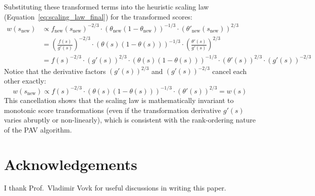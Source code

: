\documentclass[11pt]{article}
\begin{document}
	Substituting these transformed terms into the heuristic scaling law (Equation~\ref{eq:scaling_law_final}) for the transformed scores:
	\begin{align}
		w(s_{\text{new}}) &\propto f_{\text{new}}(s_{\text{new}})^{-2/3} \cdot (\theta_{\text{new}}(1-\theta_{\text{new}}))^{-1/3} \cdot (\theta'_{\text{new}}(s_{\text{new}}))^{2/3} \\
		&= \left( \frac{f(s)}{g'(s)} \right)^{-2/3} \cdot (\theta(s)(1-\theta(s)))^{-1/3} \cdot \left( \frac{\theta'(s)}{g'(s)} \right)^{2/3} \\
		&= f(s)^{-2/3} \cdot (g'(s))^{2/3} \cdot (\theta(s)(1-\theta(s)))^{-1/3} \cdot (\theta'(s))^{2/3} \cdot (g'(s))^{-2/3}
	\end{align}
	Notice that the derivative factors $(g'(s))^{2/3}$ and $(g'(s))^{-2/3}$ cancel each other exactly:
	\begin{equation}
		w(s_{\text{new}}) \propto f(s)^{-2/3} \cdot (\theta(s)(1-\theta(s)))^{-1/3} \cdot (\theta'(s))^{2/3} = w(s)
	\end{equation}
	This cancellation shows that the scaling law is mathematically invariant to monotonic score transformations (even if the transformation derivative $g'(s)$ varies abruptly or non-linearly), which is consistent with the rank-ordering nature of the PAV algorithm.
	
	\section*{Acknowledgements}

	I thank Prof.\ Vladimir Vovk for useful discussions in writing this paper.
\end{document}
